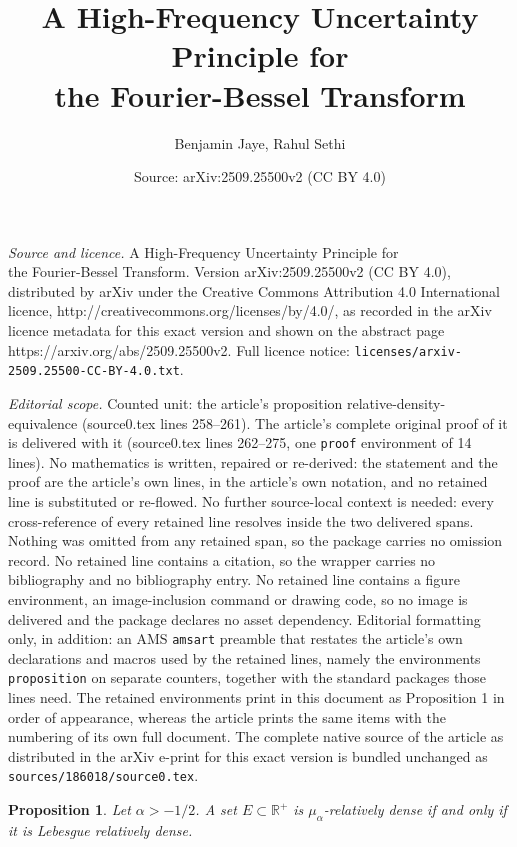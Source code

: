 \documentclass[10pt,a4paper]{amsart}
\title{A High-Frequency Uncertainty Principle for\\ the Fourier-Bessel Transform}
\author{Benjamin Jaye, Rahul Sethi}
\date{Source: arXiv:2509.25500v2 (CC BY 4.0)}
\newtheorem{proposition}{Proposition}
\newcommand{\R}{\mathbb R}
\begin{document}
\maketitle

\noindent\emph{Source and licence.} A High-Frequency Uncertainty Principle for\\ the Fourier-Bessel Transform. Version arXiv:2509.25500v2 (CC BY 4.0), distributed by arXiv under the Creative Commons Attribution 4.0 International licence, http://creativecommons.org/licenses/by/4.0/, as recorded in the arXiv licence metadata for this exact version and shown on the abstract page https://arxiv.org/abs/2509.25500v2. Full licence notice: \texttt{licenses/arxiv-2509.25500-CC-BY-4.0.txt}.\par\smallskip

\noindent\textit{Editorial scope.} Counted unit: the article's proposition relative-density-equivalence (source0.tex lines 258--261). The article's complete original proof of it is delivered with it (source0.tex lines 262--275, one \texttt{proof} environment of 14 lines). No mathematics is written, repaired or re-derived: the statement and the proof are the article's own lines, in the article's own notation, and no retained line is substituted or re-flowed.  No further source-local context is needed: every cross-reference of every retained line resolves inside the two delivered spans.  Nothing was omitted from any retained span, so the package carries no omission record.  No retained line contains a citation, so the wrapper carries no bibliography and no bibliography entry.  No retained line contains a figure environment, an image-inclusion command or drawing code, so no image is delivered and the package declares no asset dependency.  Editorial formatting only, in addition: an AMS \texttt{amsart} preamble that restates the article's own declarations and macros used by the retained lines, namely the environments \texttt{proposition} on separate counters, together with the standard packages those lines need.  The retained environments print in this document as Proposition 1 in order of appearance, whereas the article prints the same items with the numbering of its own full document.  The complete native source of the article as distributed in the arXiv e-print for this exact version is bundled unchanged as \texttt{sources/186018/source0.tex}.
\begin{proposition}
\label{relative-density-equivalence}
    Let $\alpha > -1/2$. A set $E \subset \R^+$ is $\mu_\alpha$-relatively dense if and only if it is Lebesgue relatively dense. 
\end{proposition}
\end{document}
